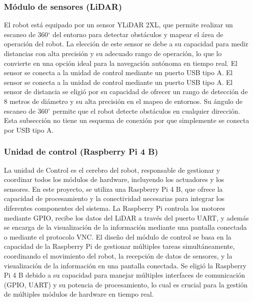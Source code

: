     \subsubsection{M\'odulo de sensores (LiDAR)} %
    \label{ssub:modsen}
    El robot est\'a equipado por un sensor YLiDAR 2XL, que permite realizar un escaneo de
        360$^{\circ}$  del entorno para detectar obst\'aculos y mapear el \'area de operaci\'on del robot. La
        elecci\'on de este sensor se debe a su capacidad para medir distancias con alta
        precisi\'on y su adecuado rango de operaci\'on, lo que lo convierte en una opci\'on ideal
        para la navegaci\'on aut\'onoma en tiempo real.
        El sensor se conecta a la unidad de control mediante un puerto USB tipo A.
    \vskip 0.5cm
    El sensor se conecta a la unidad de control mediante un puerto USB tipo A.
    \vskip 0.5cm
    El sensor de distancia se eligi\'o por su capacidad de ofrecer un rango de detecci\'on de
        8 metros de di\'ametro y su alta precisi\'on en el mapeo de entornos. Su \'angulo de
        escaneo de 360$^{\circ}$   permite que el robot detecte obst\'aculos en cualquier direcci\'on.
    \vskip 0.5cm
    Esta subsecci\'on no tiene un esquema de conexi\'on por que simplemente se conecta
        por USB tipo A.
    \vskip 0.5cm
    \subsubsection{Unidad de control (Raspberry Pi 4 B)} %
    \label{ssub:modcon}
    La unidad de Control es el cerebro del robot, responsable de gestionar y coordinar
        todos los m\'odulos de hardware, incluyendo los actuadores y los sensores. En este
        proyecto, se utiliza una Raspberry Pi 4 B, que ofrece la capacidad de procesamiento y
        la conectividad necesarias para integrar los diferentes componentes del sistema.
    \vskip 0.5cm
    La Raspberry Pi controla los motores mediante GPIO, recibe los datos del LiDAR a
        trav\'es del puerto UART, y adem\'as se encarga de la visualizaci\'on de la informaci\'on
        mediante una pantalla conectada o mediante el protocolo VNC.
    \vskip 0.5cm
    El dise\~no del m\'odulo de control se basa en la capacidad de la Raspberry Pi de gestionar
        m\'ultiples tareas simult\'aneamente, coordinando el movimiento del robot, la recepci\'on
        de datos de sensores, y la visualizaci\'on de la informaci\'on en una pantalla conectada.
    \vskip 0.5cm
    Se eligi\'o la Raspberry Pi 4 B debido a su capacidad para manejar m\'ultiples interfaces
        de comunicaci\'on (GPIO, UART) y su potencia de procesamiento, lo cual es crucial para
        la gesti\'on de m\'ultiples m\'odulos de hardware en tiempo real.
    \vskip 0.5cm
